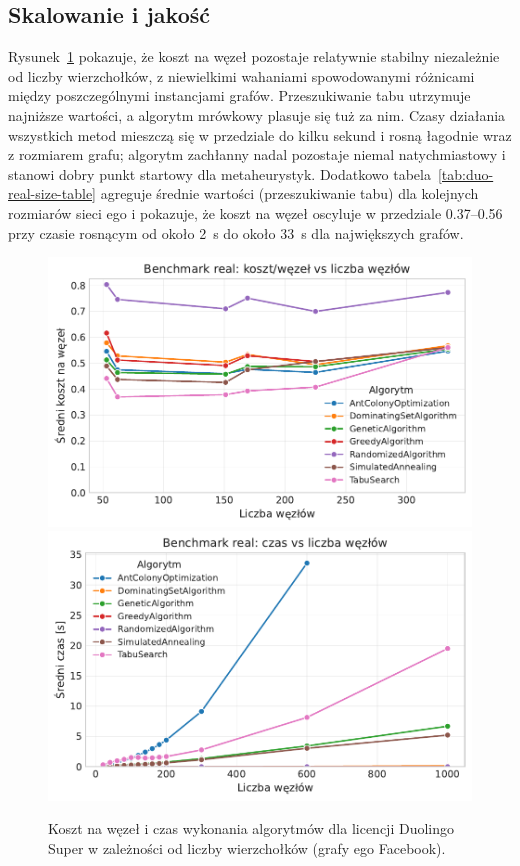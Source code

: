 \subsection{Skalowanie i jakość}

Rysunek~\ref{fig:duo-real-size} pokazuje, że koszt na węzeł pozostaje relatywnie stabilny niezależnie od liczby wierzchołków, z niewielkimi wahaniami spowodowanymi różnicami między poszczególnymi instancjami grafów. Przeszukiwanie tabu utrzymuje najniższe wartości, a algorytm mrówkowy plasuje się tuż za nim. Czasy działania wszystkich metod mieszczą się w przedziale do kilku sekund i rosną łagodnie wraz z rozmiarem grafu; algorytm zachłanny nadal pozostaje niemal natychmiastowy i stanowi dobry punkt startowy dla metaheurystyk. Dodatkowo tabela~\ref{tab:duo-real-size-table} agreguje średnie wartości (przeszukiwanie tabu) dla kolejnych rozmiarów sieci ego i pokazuje, że koszt na węzeł oscyluje w przedziale 0.37--0.56 przy czasie rosnącym od około 2~s do około 33~s dla największych grafów.

\begin{figure}[H]
  \centering
  \includegraphics[width=0.48\linewidth]{assets/figures/benchmark/real/cost_per_node_vs_nodes.pdf}
  \hfill
  \includegraphics[width=0.48\linewidth]{assets/figures/benchmark/real/time_vs_nodes.pdf}
  \caption{Koszt na węzeł i czas wykonania algorytmów dla licencji Duolingo Super w zależności od liczby wierzchołków (grafy ego Facebook).}
  \label{fig:duo-real-size}
\end{figure}


